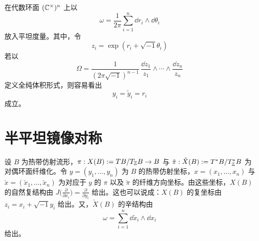 \begin{example}
在代数环面 $(\mathbb{C}^\times)^n$ 上以
\begin{equation}
  \omega = \frac{1}{2\pi}\sum_{i=1}^{n}\dd r_i\wedge \dd\theta_i \tag{27.10}
\end{equation}
放入平坦度量。其中，令
\begin{equation}
  z_i = \exp(r_i + \sqrt{-1}\theta_i) \tag{27.11}
\end{equation}
若以
\begin{equation}
  \Omega = \frac{1}{(2\pi\sqrt{-1})^{n-1}}\,
  \frac{\dd z_1}{z_1}\wedge\cdots\wedge\frac{\dd z_n}{z_n} \tag{27.12}
\end{equation}
定义全纯体积形式，则容易看出
\begin{equation}
  y_i = \tilde y_i = r_i \tag{27.13}
\end{equation}
成立。
\end{example}

\section{半平坦镜像对称}

设 $B$ 为热带仿射流形，$\pi: X(B) := TB/T_{\mathbb{Z}}B \to B$ 与 $\check\pi: \check X(B) := T^*B/T^*_{\mathbb{Z}}B$ 为对偶环面纤维化。令 $y = (y_1,\dots,y_n)$ 为 $B$ 的热带仿射坐标，$x = (x_1,\dots,x_n)$ 与 $\check x = (\check x_1,\dots,\check x_n)$ 为对应于 $y$ 的 $\pi$ 以及 $\check\pi$ 的纤维方向坐标。由这些坐标，$X(B)$ 的自然复结构由 $J\big(\frac{\partial}{\partial x_i}\big) = \frac{\partial}{\partial y_i}$ 给出。这也可以说成：$X(B)$ 的复坐标由 $z_i = x_i + \sqrt{-1}y_i$ 给出。又，$\check X(B)$ 的辛结构由
\begin{equation}
  \omega = \sum_{i=1}^{n}\dd\check x_i\wedge \dd x_i \tag{28.1}
\end{equation}
给出。

